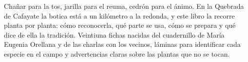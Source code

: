 Chañar para la tos, jarilla para el reuma, cedrón para el ánimo. En la
Quebrada de Cafayate la botica está a un kilómetro a la redonda, y este
libro la recorre planta por planta: cómo reconocerla, qué parte se usa,
cómo se prepara y qué dice de ella la tradición. Veintiuna fichas nacidas
del cuadernillo de María Eugenia Orellana y de las charlas con los
vecinos, láminas para identificar cada especie en el campo y
advertencias claras sobre las plantas que no se tocan.%
